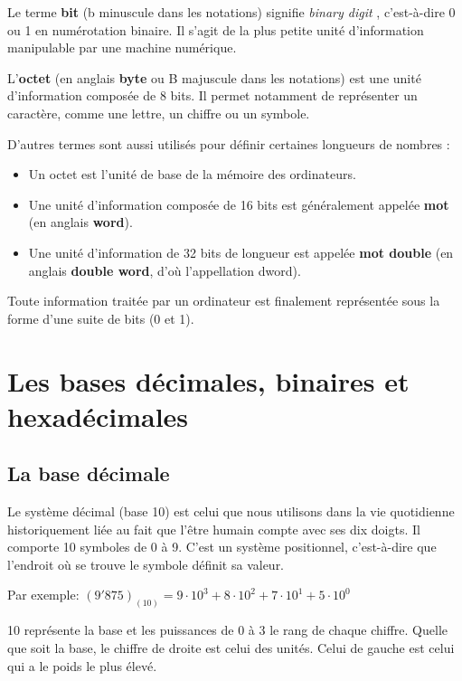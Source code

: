 \documentclass[11pt, a4paper]{book}
\begin{document}
\begin{definition}
Le terme {\bf bit} (b minuscule dans les notations) signifie {\it binary digit }, c'est-à-dire 0 ou 1 en numérotation binaire. Il s'agit de la plus petite unité d'information manipulable par une machine numérique. 


L'{\bf octet} (en anglais {\bf byte} ou B majuscule dans les notations) est une unité d'information composée de 8 bits. Il permet notamment de représenter un caractère, comme une lettre, un chiffre ou un symbole.
\end{definition}

D'autres termes sont aussi utilisés pour définir certaines longueurs de nombres :
\begin{itemize}
\item Un octet est l’unité de base de la mémoire des ordinateurs.
\item Une unité d'information composée de 16 bits est généralement appelée {\bf mot} (en anglais {\bf word}).

\item Une unité d'information de 32 bits de longueur est appelée {\bf mot double} (en anglais {\bf double word}, d'où l'appellation dword).
\end{itemize}
\begin{aretenir}
Toute information traitée par un ordinateur est finalement représentée sous la forme d'une suite de bits (0 et 1).
\end{aretenir}

\section{Les bases décimales, binaires et hexadécimales}


\subsection{La base décimale}

Le système décimal (base 10) est celui que nous utilisons dans la vie quotidienne historiquement liée au fait que l'être humain compte avec ses dix doigts. Il comporte 10 symboles de 0 à 9. C'est un système positionnel, c'est-à-dire que l'endroit où se trouve le symbole définit sa valeur.

Par exemple: $(9'875)_{(10)}=9 \cdot 10^3 + 8 \cdot 10^2 + 7\cdot 10^1 + 5 \cdot 10^0$

10 représente la base et les puissances de 0 à 3 le rang de chaque chiffre. Quelle que soit la base, le chiffre de droite est celui des unités. Celui de gauche est celui qui a le poids le plus élevé.
\end{document}
